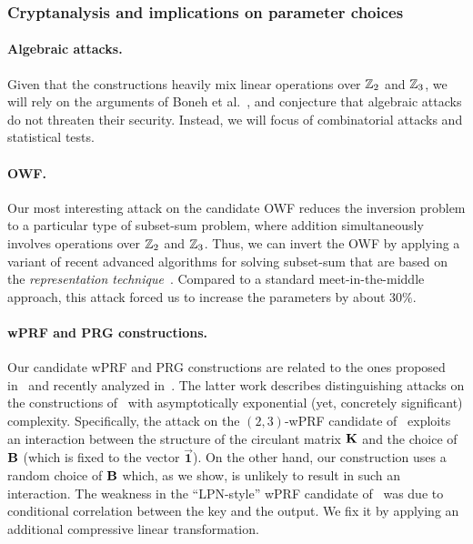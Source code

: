 \begin{itemize}
\end{itemize}

\subsubsection{Cryptanalysis and implications on parameter choices}

\paragraph{Algebraic attacks.}
Given that the constructions heavily mix linear operations over $\mathbb{Z}_2$ and $\mathbb{Z}_3$,
we will rely on the arguments of Boneh et al.~\cite{boneh2018-darkmatter},
and conjecture that algebraic attacks do not threaten their security.
Instead, we will focus of combinatorial attacks and statistical tests.

\paragraph{OWF.}
Our most interesting attack on the
candidate OWF reduces the inversion problem to a particular type of subset-sum problem,
where addition simultaneously involves operations over $\mathbb{Z}_2$ and $\mathbb{Z}_3$.
Thus, we can invert the OWF by applying a variant of recent advanced algorithms
for solving subset-sum that are based on the
\emph{representation technique}~\cite{Howgrave-GrahamJ10,BeckerCJ11,BonnetainBSS20}.
Compared to a standard meet-in-the-middle approach,
this attack forced us to increase the parameters by about $30\%$.

\paragraph{wPRF and PRG constructions.}
Our candidate wPRF and PRG constructions are related to the ones proposed in~\cite{boneh2018-darkmatter}
and recently analyzed in~\cite{cheon2020-adventures}.
The latter work describes distinguishing attacks on the constructions of~\cite{boneh2018-darkmatter}
with asymptotically exponential (yet, concretely significant) complexity.
Specifically, the attack on the $(2,3)$-wPRF candidate of~\cite{boneh2018-darkmatter} exploits an interaction
between the structure of the circulant matrix $\mat{K}$ and the choice of $\mat{B}$
(which is fixed to the vector $\vec{\textbf{1}}$).
On the other hand, our construction uses a random choice of $\mat{B}$ which, as we show, is
unlikely to result in such an interaction.
The weakness in the ``LPN-style'' wPRF candidate of~\cite{boneh2018-darkmatter}
was due to conditional correlation between the key and the output. We fix it by applying an additional compressive linear transformation.


